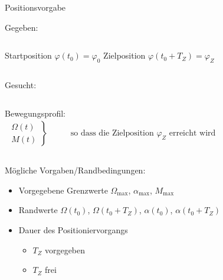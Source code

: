 \begin{frame}{Positionsvorgabe}
%
\begin{block}{Gegeben:}
%
\begin{columns}[T]
%
Startposition $\varphi(t_0)=\varphi_0$
%
Zielposition $\varphi(t_0+T_Z)=\varphi_Z$
%
\end{columns}
%
\end{block}
%
\begin{block}{Gesucht:}
%
\begin{columns}
%
Bewegungsprofil:
%
%
\begin{align}
%
\left. \begin{array}{l} \Omega(t) \\ M(t)\end{array}\right\} &\qquad \text{so
dass die Zielposition~$\varphi_Z$ erreicht wird}\nonumber
%
\end{align}
%
\end{columns}
%
\end{block}
%
Mögliche Vorgaben/Randbedingungen:
%
\begin{itemize}
  \item Vorgegebene Grenzwerte $\Omega_{\max}$, $\alpha_{\max}$, $M_{\max}$
  \item Randwerte $\Omega(t_0)$, $\Omega(t_0+T_Z)$, $\alpha(t_0)$,
  $\alpha(t_0+T_Z)$
  \item Dauer des Positioniervorgangs
  \begin{itemize}
    \item $T_Z$ vorgegeben
    \item $T_Z$ frei
  \end{itemize}
\end{itemize}
%
\end{frame}
%
%
%
